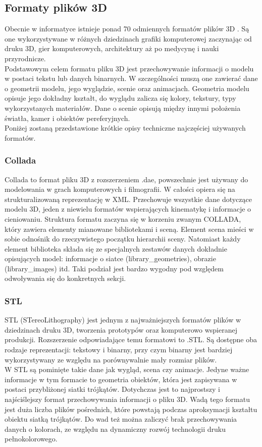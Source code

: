 \newpage
\subsection{Formaty plików 3D}
Obecnie w informatyce istnieje ponad 70 odmiennych formatów plików 3D%
. Są one wykorzystywane w różnych dziedzinach grafiki komputerowej zaczynając od druku 3D, gier komputerowych, architektury aż po medycynę i nauki przyrodnicze. \\
Podstawowym celem formatu pliku 3D jest przechowywanie informacji o modelu w postaci tekstu lub danych binarnych. W szczególności muszą one zawierać dane o geometrii modelu, jego wyglądzie, scenie oraz animacjach. Geometria modelu opisuje jego dokładny kształt, do wyglądu zalicza się kolory, tekstury, typy wykorzystanych materiałów. Dane o scenie opisują między innymi położenia światła, kamer i obiektów pereferyjnych. \\
Poniżej zostaną przedstawione krótkie opisy techniczne najczęściej używanych formatów. %

\subsubsection{Collada}
Collada to format pliku 3D z rozszerzeniem .dae, powszechnie jest używany do modelowania w grach komputerowych i filmografii. W całości opiera się na strukturalizowaną reprezentację w XML. Przechowuje wszystkie dane dotyczące modelu 3D, jeden z niewielu formatów wspierających kinematykę i informacje o cieniowaniu.
Struktura formatu zaczyna się w korzeniu zwanym COLLADA, który zawiera elementy mianowane bibliotekami i sceną. Element scena mieści w sobie odnośnik do rzeczywistego początku hierarchii sceny. Natomiast każdy element biblioteka składa się ze specjalnych zestawów danych dokładnie opisujących model: informacje o siatce (library\_geometries), obrazie (library\_images) itd. Taki podział jest bardzo wygodny pod względem odwoływania się do konkretnych sekcji.  

\subsubsection{STL}
STL (STereoLithography) jest jednym z najważniejszych formatów plików w dziedzinach druku 3D, tworzenia prototypów oraz komputerowo wspieranej produkcji. Rozszerzenie odpowiadające temu formatowi to .STL. Są dostępne oba rodzaje reprezentacji: tekstowy i binarny, przy czym binarny jest bardziej wykorzystywany ze względu na porównywalnie mały rozmiar plików. \\
W STL są pominięte takie dane jak wygląd, scena czy animacje. Jedyne ważne informacje w tym formacie to geometria obiektów, która jest zapisywana w postaci przybliżonej siatki trójkątów. Dotychczas jest to najprostszy i najściślejszy format przechowywania informacji o pliku 3D. 
Wadą tego formatu jest duża liczba plików pośrednich, które powstają podczas aproksymacji kształtu obiektu siatką trójkątów. Do wad też można zaliczyć brak przechowywania danych o kolorach, ze  względu na dynamiczny rozwój technologii druku pełnokolorowego.

